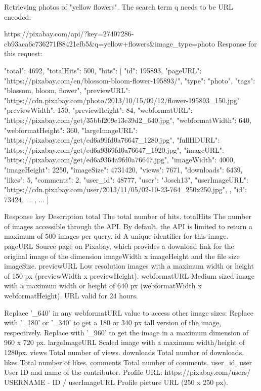 Retrieving photos of "yellow flowers". The search term q needs to be URL encoded:

https://pixabay.com/api/?key=27407286-cb93aca6c736271f88421efb5&q=yellow+flowers&image_type=photo
Response for this request:

{
"total": 4692,
"totalHits": 500,
"hits": [
    {
        "id": 195893,
        "pageURL": "https://pixabay.com/en/blossom-bloom-flower-195893/",
        "type": "photo",
        "tags": "blossom, bloom, flower",
        "previewURL": "https://cdn.pixabay.com/photo/2013/10/15/09/12/flower-195893_150.jpg"
        "previewWidth": 150,
        "previewHeight": 84,
        "webformatURL": "https://pixabay.com/get/35bbf209e13e39d2_640.jpg",
        "webformatWidth": 640,
        "webformatHeight": 360,
        "largeImageURL": "https://pixabay.com/get/ed6a99fd0a76647_1280.jpg",
        "fullHDURL": "https://pixabay.com/get/ed6a9369fd0a76647_1920.jpg",
        "imageURL": "https://pixabay.com/get/ed6a9364a9fd0a76647.jpg",
        "imageWidth": 4000,
        "imageHeight": 2250,
        "imageSize": 4731420,
        "views": 7671,
        "downloads": 6439,
        "likes": 5,
        "comments": 2,
        "user_id": 48777,
        "user": "Josch13",
        "userImageURL": "https://cdn.pixabay.com/user/2013/11/05/02-10-23-764_250x250.jpg",
    },
    {
        "id": 73424,
        ...
    },
    ...
]
}


Response key	Description
total	The total number of hits.
totalHits	The number of images accessible through the API. By default, the API is limited to return a maximum of 500 images per query.
id	A unique identifier for this image.
pageURL	Source page on Pixabay, which provides a download link for the original image of the dimension imageWidth x imageHeight and the file size imageSize.
previewURL	Low resolution images with a maximum width or height of 150 px (previewWidth x previewHeight).
webformatURL	
Medium sized image with a maximum width or height of 640 px (webformatWidth x webformatHeight). URL valid for 24 hours.

Replace '_640' in any webformatURL value to access other image sizes: 
Replace with '_180' or '_340' to get a 180 or 340 px tall version of the image, respectively. Replace with '_960' to get the image in a maximum dimension of 960 x 720 px.
largeImageURL	Scaled image with a maximum width/height of 1280px.
views	Total number of views.
downloads	Total number of downloads.
likes	Total number of likes.
comments	Total number of comments.
user_id, user	User ID and name of the contributor. Profile URL: https://pixabay.com/users/{ USERNAME }-{ ID }/
userImageURL	Profile picture URL (250 x 250 px).


